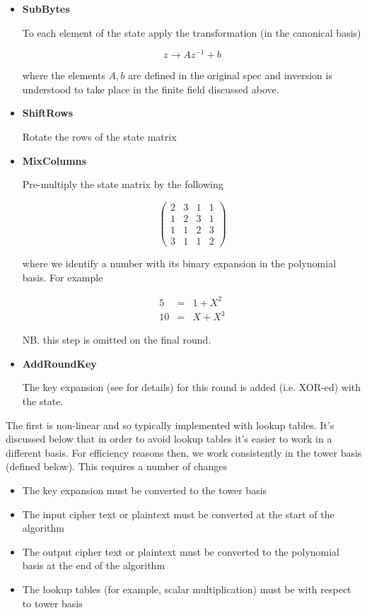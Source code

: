 \documentclass[a4paper]{article}
\numberwithin{equation}{section}
\begin{document}
\begin{itemize}
\item {\bf{SubBytes}}

To each element of the state apply the transformation (in the canonical basis)
   
   $$ z \rightarrow A z^{-1} + b $$
   
 where the elements $A,b$ are defined in the original spec \cite{NISTAES} and inversion is understood to take place in the finite field discussed above.
 
\item {\bf{ShiftRows}}

Rotate the rows of the state matrix

\item {\bf{MixColumns}}

Pre-multiply the state matrix by the following

\[
\left( \begin{array}{cccc}
2 & 3 & 1 & 1 \\
1 & 2 & 3 & 1 \\
1 & 1 & 2 & 3 \\
3  & 1 & 1 & 2 
\end{array} \right)
\]

where we identify a number with its binary expansion in the polynomial basis. For example 

\begin{eqnarray*}
  5 &=& 1 + X^2 \\
  10 &=& X + X^3
\end{eqnarray*}
	
NB. this step is omitted on the final round.

\item {\bf{AddRoundKey}}

The key expansion (see \cite{NISTAES} for details) for this round is added (i.e. XOR-ed) with the state.

\end{itemize}

The first is non-linear and so typically implemented with lookup tables. It's discussed below that in order to avoid lookup tables it's easier to work in a different basis. For efficiency reasons then, we work consistently in the tower basis (defined below). This requires a number of changes

\begin{itemize}
\item The key expansion must be converted to the tower basis
\item The input cipher text or plaintext must be converted at the start of the algorithm
\item The output cipher text or plaintext must be converted to the polynomial basis at the end of the algorithm
\item The lookup tables (for example, scalar multiplication) must be with respect to tower basis
\end{itemize}
\end{document}
